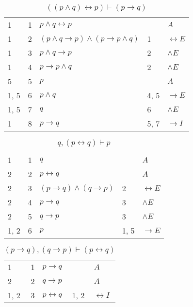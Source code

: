 \documentclass{article}
\begin{document}
\begin{table}[htbp]\caption*{$((p∧q)↔p) ⊢ (p→q)$}\centering\begin{tabular}{lrlll}
{1} & 1 & $p∧q↔p$ & {} & $A$ \\
{1} & 2 & $(p∧q→p)∧(p→p∧q)$ & {1} & $↔E$ \\
{1} & 3 & $p∧q→p$ & {2} & $∧E$ \\
{1} & 4 & $p→p∧q$ & {2} & $∧E$ \\
{5} & 5 & $p$ & {} & $A$ \\
{1, 5} & 6 & $p∧q$ & {4, 5} & $→E$ \\
{1, 5} & 7 & $q$ & {6} & $∧E$ \\
{1} & 8 & $p→q$ & {5, 7} & $→I$ \\
\end{tabular}
\end{table}
\begin{table}[htbp]\caption*{$q,(p↔q) ⊢ p$}\centering\begin{tabular}{lrlll}
{1} & 1 & $q$ & {} & $A$ \\
{2} & 2 & $p↔q$ & {} & $A$ \\
{2} & 3 & $(p→q)∧(q→p)$ & {2} & $↔E$ \\
{2} & 4 & $p→q$ & {3} & $∧E$ \\
{2} & 5 & $q→p$ & {3} & $∧E$ \\
{1, 2} & 6 & $p$ & {1, 5} & $→E$ \\
\end{tabular}
\end{table}
\begin{table}[htbp]\caption*{$(p→q),(q→p) ⊢ (p↔q)$}\centering\begin{tabular}{lrlll}
{1} & 1 & $p→q$ & {} & $A$ \\
{2} & 2 & $q→p$ & {} & $A$ \\
{1, 2} & 3 & $p↔q$ & {1, 2} & $↔I$ \\
\end{tabular}
\end{table}
\end{document}
